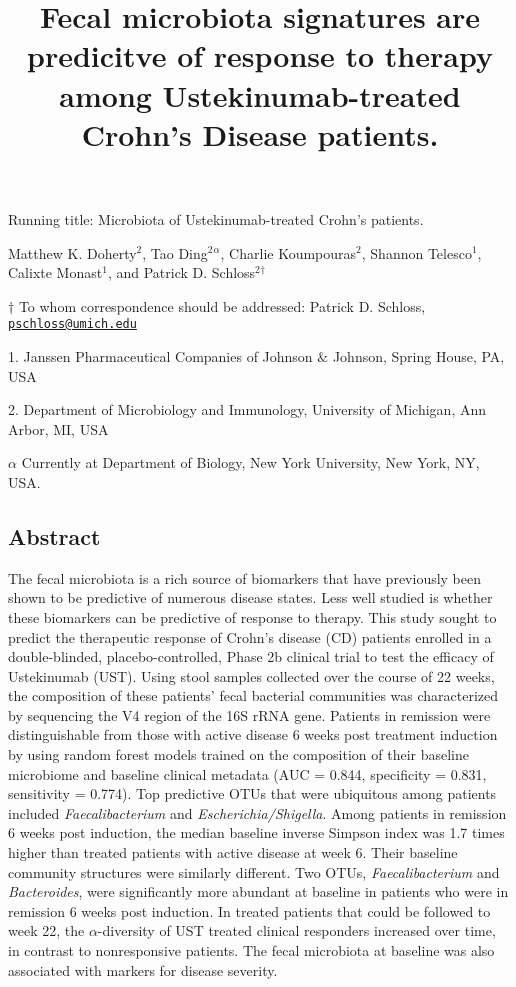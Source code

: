 \documentclass[12pt,]{article}
\title{Fecal microbiota signatures are predicitve of response to therapy among
Ustekinumab-treated Crohn's Disease patients.}
\author{}
\date{}
\begin{document}
\maketitle

\vspace{35mm}

Running title: Microbiota of Ustekinumab-treated Crohn's patients.

\vspace{35mm} Matthew K. Doherty\({^2}\), Tao Ding\({^2}\)\({^\alpha}\),
Charlie Koumpouras\({^2}\), Shannon Telesco\({^1}\), Calixte
Monast\({^1}\), and Patrick D. Schloss\({^2}\)\({^\dagger}\)

\(\dagger\) To whom correspondence should be addressed: Patrick D.
Schloss,
\href{mailto:pschloss@umich.edu}{\nolinkurl{pschloss@umich.edu}}

1. Janssen Pharmaceutical Companies of Johnson \({\&}\) Johnson, Spring
House, PA, USA

2. Department of Microbiology and Immunology, University of Michigan,
Ann Arbor, MI, USA

\({\alpha}\) Currently at Department of Biology, New York University,
New York, NY, USA.

\newpage

\subsection{Abstract}\label{abstract}

The fecal microbiota is a rich source of biomarkers that have previously
been shown to be predictive of numerous disease states. Less well
studied is whether these biomarkers can be predictive of response to
therapy. This study sought to predict the therapeutic response of
Crohn's disease (CD) patients enrolled in a double-blinded,
placebo-controlled, Phase 2b clinical trial to test the efficacy of
Ustekinumab (UST). Using stool samples collected over the course of 22
weeks, the composition of these patients' fecal bacterial communities
was characterized by sequencing the V4 region of the 16S rRNA gene.
Patients in remission were distinguishable from those with active
disease 6 weeks post treatment induction by using random forest models
trained on the composition of their baseline microbiome and baseline
clinical metadata (AUC = 0.844, specificity = 0.831, sensitivity =
0.774). Top predictive OTUs that were ubiquitous among patients included
\emph{Faecalibacterium} and \emph{Escherichia/Shigella}. Among patients
in remission 6 weeks post induction, the median baseline inverse Simpson
index was 1.7 times higher than treated patients with active disease at
week 6. Their baseline community structures were similarly different.
Two OTUs, \emph{Faecalibacterium} and \emph{Bacteroides}, were
significantly more abundant at baseline in patients who were in
remission 6 weeks post induction. In treated patients that could be
followed to week 22, the \({\alpha}\)-diversity of UST treated clinical
responders increased over time, in contrast to nonresponsive patients.
The fecal microbiota at baseline was also associated with markers for
disease severity.
\end{document}
